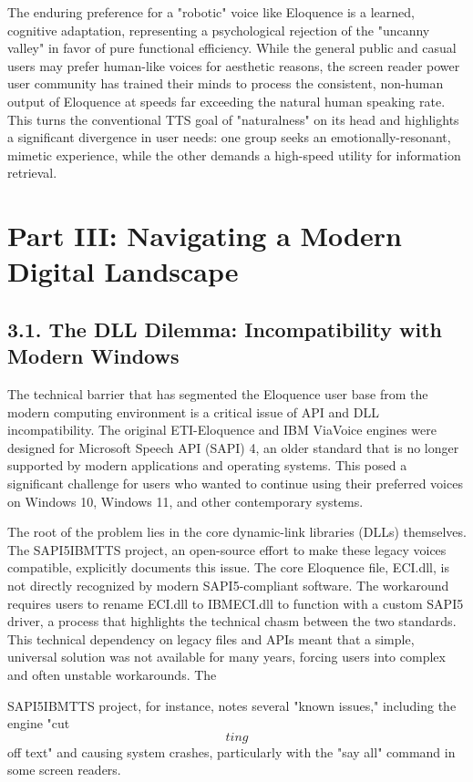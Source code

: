 The enduring preference for a "robotic" voice like Eloquence is a
learned, cognitive adaptation, representing a psychological rejection of
the "uncanny valley" in favor of pure functional efficiency. While the
general public and casual users may prefer human-like voices for
aesthetic reasons, the screen reader power user community has trained
their minds to process the consistent, non-human output of Eloquence at
speeds far exceeding the natural human speaking rate.\supercite{13} This turns the
conventional TTS goal of "naturalness" on its head and highlights a
significant divergence in user needs: one group seeks an
emotionally-resonant, mimetic experience, while the other demands a
high-speed utility for information retrieval.

\section{Part III: Navigating a Modern Digital Landscape}
\subsection{3.1. The DLL Dilemma: Incompatibility with Modern Windows}
The technical barrier that has segmented the Eloquence user base from
the modern computing environment is a critical issue of API and DLL
incompatibility. The original ETI-Eloquence and IBM ViaVoice engines
were designed for Microsoft Speech API (SAPI) 4, an older standard that
is no longer supported by modern applications and operating systems.\supercite{8}
This posed a significant challenge for users who wanted to continue
using their preferred voices on Windows 10, Windows 11, and other
contemporary systems.

The root of the problem lies in the core dynamic-link libraries (DLLs)
themselves. The SAPI5IBMTTS project, an open-source effort to make these
legacy voices compatible, explicitly documents this issue. The core
Eloquence file, ECI.dll, is not directly recognized by modern
SAPI5-compliant software. The workaround requires users to rename
ECI.dll to IBMECI.dll to function with a custom SAPI5 driver, a process
that highlights the technical chasm between the two standards.\supercite{8} This
technical dependency on legacy files and APIs meant that a simple,
universal solution was not available for many years, forcing users into
complex and often unstable workarounds. The

SAPI5IBMTTS project, for instance, notes several "known issues,"
including the engine "cut\[ting\] off text" and causing system
crashes, particularly with the "say all" command in some screen
readers.\supercite{8}

